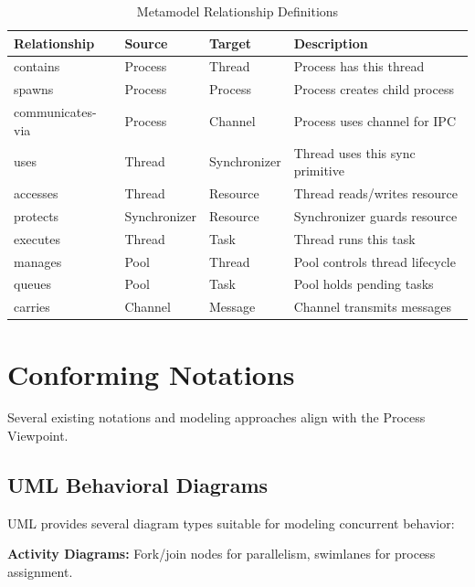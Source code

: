 \documentclass[11pt,letterpaper]{article}
\begin{document}
\begin{table}[H]
\centering
\caption{Metamodel Relationship Definitions}
\small
\begin{tabular}{@{}L{2.3cm}L{2.3cm}L{2.3cm}L{\dimexpr\linewidth-6.9cm-6\tabcolsep\relax}@{}}
\toprule
\textbf{Relationship} & \textbf{Source} & \textbf{Target} & \textbf{Description} \\
\midrule
contains & Process & Thread & Process has this thread \\
\addlinespace
spawns & Process & Process & Process creates child process \\
\addlinespace
communicates-via & Process & Channel & Process uses channel for IPC \\
\addlinespace
uses & Thread & Synchronizer & Thread uses this sync primitive \\
\addlinespace
accesses & Thread & Resource & Thread reads/writes resource \\
\addlinespace
protects & Synchronizer & Resource & Synchronizer guards resource \\
\addlinespace
executes & Thread & Task & Thread runs this task \\
\addlinespace
manages & Pool & Thread & Pool controls thread lifecycle \\
\addlinespace
queues & Pool & Task & Pool holds pending tasks \\
\addlinespace
carries & Channel & Message & Channel transmits messages \\
\bottomrule
\end{tabular}
\end{table}

\section{Conforming Notations}

Several existing notations and modeling approaches align with the Process Viewpoint.

\subsection{UML Behavioral Diagrams}

UML provides several diagram types suitable for modeling concurrent behavior:

\textbf{Activity Diagrams:} Fork/join nodes for parallelism, swimlanes for process assignment.
\end{document}

